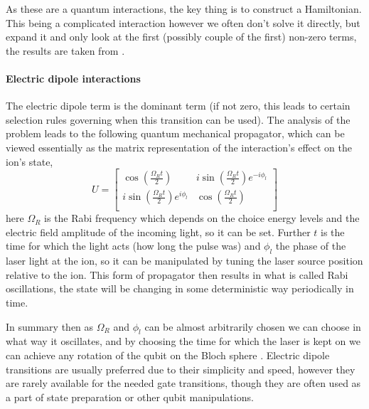 As these are a quantum interactions, the key thing is to construct a Hamiltonian.
This being a complicated interaction however we often don't solve it directly, but expand it and only look at the first (possibly couple of the first) non-zero terms, the results are taken from \cite{schaferFastGatesMixedSpecies2020}.

\paragraph{Electric dipole interactions}
The electric dipole term is the dominant term (if not zero, this leads to certain selection rules governing when this transition can be used).
The analysis of the problem leads to the following quantum mechanical propagator\footnotemark, which can be viewed essentially as the matrix representation of the interaction's effect on the ion's state,
\begin{equation}
    U = \begin{bmatrix}
        \cos{(\frac{\Omega_R t}{2})} & i \sin{(\frac{\Omega_R t}{2})} e^{-i \phi_l} \\
        i \sin{(\frac{\Omega_R t}{2})} e^{i \phi_l} & \cos{(\frac{\Omega_R t}{2})} \\
    \end{bmatrix}
\end{equation}
here $\Omega_R$ is the Rabi frequency which depends on the choice energy levels and the electric field amplitude of the incoming light, so it can be set.
Further $t$ is the time for which the light acts (how long the pulse was) and $\phi_l$ the phase of the laser light at the ion, so it can be manipulated by tuning the laser source position relative to the ion.
This form of propagator then results in what is called Rabi oscillations, the state will be changing in some deterministic way periodically in time.

In summary then as $\Omega_R$ and $\phi_l$ can be almost arbitrarily chosen we can choose in what way it oscillates, and by choosing the time for which the laser is kept on we can achieve any rotation of the qubit on the Bloch sphere \cite{schaferFastGatesMixedSpecies2020}.
Electric dipole transitions are usually preferred due to their simplicity and speed, however they are rarely available for the needed gate transitions, though they are often used as a part of state preparation or other qubit manipulations.

